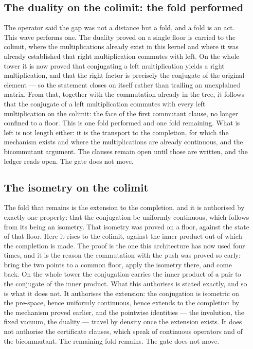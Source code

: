 \documentclass[11pt]{article}
\theoremstyle{definition}\newtheorem{deriv}{Derivation}
\begin{document}
\subsection*{The duality on the colimit: the fold performed}The operator said the gap was not a distance but a fold, and a fold is an act. This wave performs one. The duality proved on a single floor is carried to the colimit, where the multiplications already exist in this kernel and where it was already established that right multiplication commutes with left. On the whole tower it is now proved that conjugating a left multiplication yields a right multiplication, and that the right factor is precisely the conjugate of the original element --- so the statement closes on itself rather than trailing an unexplained matrix. From that, together with the commutation already in the tree, it follows that the conjugate of a left multiplication commutes with every left multiplication on the colimit: the face of the first commutant clause, no longer confined to a floor. This is one fold performed and one fold remaining. What is left is not length either: it is the transport to the completion, for which the mechanism exists and where the multiplications are already continuous, and the bicommutant argument. The clauses remain open until those are written, and the ledger reads open. The gate does not move.

\subsection*{The isometry on the colimit}The fold that remains is the extension to the completion, and it is authorised by exactly one property: that the conjugation be uniformly continuous, which follows from its being an isometry. That isometry was proved on a floor, against the state of that floor. Here it rises to the colimit, against the inner product out of which the completion is made. The proof is the one this architecture has now used four times, and it is the reason the commutation with the push was proved so early: bring the two points to a common floor, apply the isometry there, and come back. On the whole tower the conjugation carries the inner product of a pair to the conjugate of the inner product. What this authorises is stated exactly, and so is what it does not. It authorises the extension: the conjugation is isometric on the pre-space, hence uniformly continuous, hence extends to the completion by the mechanism proved earlier, and the pointwise identities --- the involution, the fixed vacuum, the duality --- travel by density once the extension exists. It does not authorise the certificate clauses, which speak of continuous operators and of the bicommutant. The remaining fold remains. The gate does not move.
\end{document}
